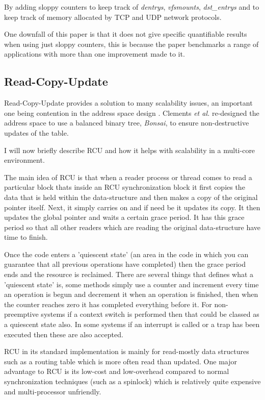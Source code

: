 \documentclass[journal]{IEEEtran}
\begin{document}
By adding sloppy counters to keep track of \emph{dentrys}, \emph{vfsmounts}, \emph{dst\_entrys} and to keep track of memory allocated by TCP and UDP network protocols. 

One downfall of this paper \cite{sloppy-counters} is that it does not give specific quantifiable results when using just sloppy counters, this is because the paper benchmarks a range of applications with more than one improvement made to it.

\subsection{Read-Copy-Update}
Read-Copy-Update provides a solution to many scalability issues, an important one being contention in the address space design \cite{Bonsai}. Clements \emph{et al.} re-designed the address space to use a balanced binary tree, \emph{Bonsai}, to ensure non-destructive updates of the table.

I will now briefly describe RCU and how it helps with scalability in a multi-core environment.

The main idea of RCU is that when a reader process or thread comes to read a particular block thats inside an RCU synchronization block it first copies the data that is held within the data-structure and then makes a copy of the original pointer itself. Next, it simply carries on and if need be it updates its copy. It then updates the global pointer and waits a certain grace period. It has this grace period so that all other readers which are reading the original data-structure have time to finish. 

Once the code enters a 'quiescent state' (an area in the code in which you can guarantee that all previous operations have completed) then the grace period ends and the resource is reclaimed. There are several things that defines what a 'quiescent state' is, some methods simply use a counter and increment every time an operation is begun and decrement it when an operation is finished, then when the counter reaches zero it has completed everything before it. For non-preemptive systems if a context switch is performed then that could be classed as a quiescent state also. In some systems if an interrupt is called or a trap has been executed then these are also accepted.

RCU in its standard implementation is mainly for read-mostly data structures such as a routing table which is more often read than updated. One major advantage to RCU is its low-cost and low-overhead compared to normal synchronization techniques (such as a spinlock) which is relatively quite expensive and multi-processor unfriendly.
\end{document}

